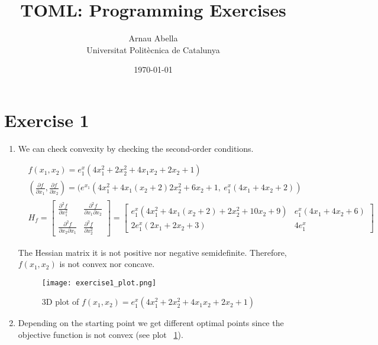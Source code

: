 \documentclass[12pt, a4paper]{article}
\title{%
  \vspace{-10ex}
  TOML: Programming Exercises
}
\author{%
  Arnau Abella \\
  \large{Universitat Polit\`ecnica de Catalunya}
}
\date{\today}
\begin{document}
\maketitle


\section*{Exercise 1}%
\label{sec:exercise_1}

\begin{enumerate}[label={(\alph*)}, ref=\arabic*, leftmargin=0cm]
  \item We can check convexity by checking the second-order conditions.

    \begin{align*}
      &f(x_1,x_2) = e^x_1(4x_1^2+2x_2^2+4x_1x_2+2x_2+1) \\
      &(\frac{\partial f}{\partial x_1}, \frac{\partial f}{\partial x_2}) =
        (e^{x_1}(4x_1^2+4x_1(x_2+2)2x_2^2 + 6x_2 + 1, \ e^x_1(4x_1 + 4x_2+2))\\
      & H_f = \begin{bmatrix}\frac{\partial^2 f}{\partial x_1^2} & \frac{\partial^2 f}{\partial x_1 \partial x_2} \\ \frac{\partial^2 f}{\partial x_2 \partial x_1} & \frac{\partial^2 f}{\partial x_2^2}\end{bmatrix} = \begin{bmatrix}e^x_1(4x_1^2 + 4x_1(x_2  + 2) + 2x_2^2 + 10x_2 + 9) & e^x_1(4x_1 + 4x_2 + 6) \\ 2e^x_1(2x_1 + 2x_2+3) & 4e^x_1 \end{bmatrix}
    \end{align*}

    The Hessian matrix it is not positive nor negative semidefinite. Therefore, $f(x_1,x_2)$ is not convex nor concave.

\begin{figure}[H]
  \centering
  \texttt{[image: exercise1\_plot.png]}
  \label{fig:exercise1}
  \caption{3D plot of $f(x_1,x_2) = e^x_1(4x_1^2+2x_2^2+4x_1x_2+2x_2+1)$}
\end{figure}

\newpage

  \item Depending on the starting point we get different optimal points since the objective function is not convex (see plot ~\ref{fig:exercise1}).


\end{enumerate}
\end{document}
